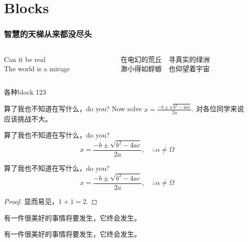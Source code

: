 \documentclass[aspectratio=1610,linespread=1.4,t]{ctexbeamer}
\begin{document}
\section{Blocks}

\begin{frame}[c]
\frametitle{智慧的天梯从来都没尽头}
\begin{columns}
\begin{column}{.4\textwidth}
\begin{pullquote}
    Can it be real\\
    The world is a mirage
\end{pullquote}
\end{column}

\begin{column}{.53\textwidth}
\renewcommand{\MiragePullquoteOpen}{\hskip-.2\ccwd『}
\begin{pullquote}
在电幻的荒丘　寻真实的绿洲\\
渺小得如蜉蝣　也仰望着宇宙
\end{pullquote}
\end{column}
\end{columns}
\end{frame}



\begin{frame}[allowframebreaks]{各种block 123}
    \begin{exampleblock}{算了我也不知道在写什么，do you?}
    Now solve $x = \frac{-b \pm \sqrt{b^2 -4ac}}{2a}$. 对各位同学来说应该挑战不大。
    \end{exampleblock}
    
    \begin{alertblock}{算了我也不知道在写什么，do you?}
    \[ x = \frac{-b \pm \sqrt{b^2 -4ac}}{2a}, \quad\therefore \alpha \neq \Omega \]
    \end{alertblock}
    
    \begin{block}{算了我也不知道在写什么，do you?}
    \[ x = \frac{-b \pm \sqrt{b^2 -4ac}}{2a}, \quad\therefore \alpha \neq \Omega \]
    \end{block}
    
    \begin{proof}
    显而易见，$1+1=2$.
    \end{proof}

    \begin{theorem}
    有一件很美好的事情将要发生，它终会发生。
    \end{theorem}
    
    \begin{definition}
    有一件很美好的事情将要发生，它终会发生。
    \end{definition}
\end{frame}
\end{document}
